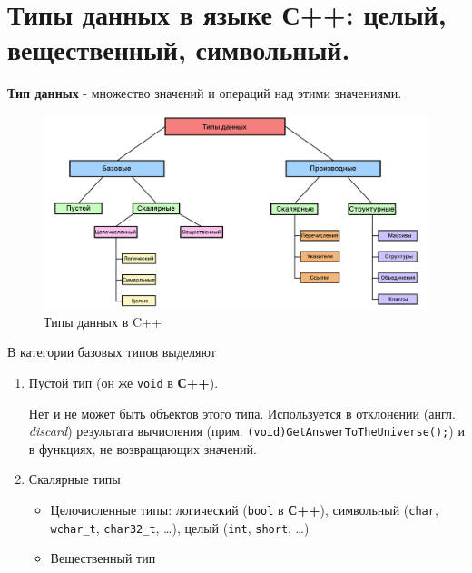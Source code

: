 \section{Типы данных в языке С++: целый, вещественный,
символьный.}\label{ux442ux438ux43fux44b-ux434ux430ux43dux43dux44bux445-ux432-ux44fux437ux44bux43aux435-ux441-ux446ux435ux43bux44bux439-ux432ux435ux449ux435ux441ux442ux432ux435ux43dux43dux44bux439-ux441ux438ux43cux432ux43eux43bux44cux43dux44bux439.}

\textbf{Тип данных} - множество значений и операций над этими
значениями.

\begin{figure}
\centering
\includegraphics{./res/сpp-types.png}
\caption{Типы данных в C++}
\end{figure}

В категории базовых типов выделяют

\begin{enumerate}
\def\labelenumi{\arabic{enumi})}
\item
  Пустой тип (он же \texttt{void} в \textbf{С++}).

  Нет и не может быть объектов этого типа. Используется в отклонении
  (англ. \emph{discard}) результата вычисления (прим.
  \texttt{(void)GetAnswerToTheUniverse();}) и в функциях, не
  возвращающих значений.
\item
  Скалярные типы

  \begin{itemize}
  \tightlist
  \item
    Целочисленные типы: логический (\texttt{bool} в \textbf{С++}),
    символьный (\texttt{char}, \texttt{wchar\_t}, \texttt{char32\_t},
    \ldots), целый (\texttt{int}, \texttt{short}, \ldots)
  \item
    Вещественный тип
  \end{itemize}
\end{enumerate}

